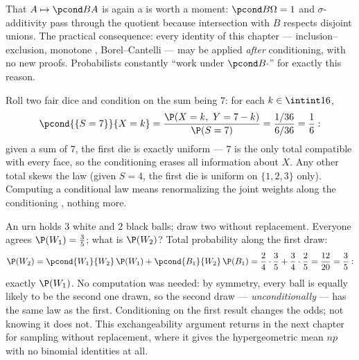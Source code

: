 \begin{remark}
That $A \mapsto \pcond BA$ is again a  is
worth a moment: $\pcond B\Omega = 1$ and $\sigma$-additivity
pass through the quotient because intersection with $B$
respects disjoint unions. The practical consequence: every
identity of this chapter --- inclusion--exclusion, monotone
, Borel--Cantelli --- may be applied \emph{after}
conditioning, with no new proofs. Probabilists constantly
``work under $\pcond B{\cdot}$'' for exactly this reason.
\end{remark}

\begin{example}\label{ex:b2:proba:sumseven}
Roll two fair dice and condition on the sum being $7$: for
each $k \in \intint16$,
\[
\pcond{\{S = 7\}}{X = k}
= \frac{\P(X = k,\ Y = 7 - k)}{\P(S = 7)}
= \frac{1/36}{6/36} = \frac16 :
\]
given a sum of $7$, the first die is exactly uniform ---
$7$ is the only total compatible with every face, so the
conditioning erases all information about $X$. Any other
total skews the law (given $S = 4$, the first die is uniform
on $\{1, 2, 3\}$ only). Computing a conditional law means
renormalizing the joint weights along the conditioning
, nothing more.
\end{example}

\begin{example}\label{ex:b2:proba:seconddraw}
An urn holds $3$ white and $2$ black balls; draw two without
replacement. Everyone agrees $\P(W_1) = \frac35$; what is
$\P(W_2)$? Total probability along the first draw:
\[
\P(W_2) = \pcond{W_1}{W_2}\,\P(W_1) +
\pcond{B_1}{W_2}\,\P(B_1)
= \frac24\cdot\frac35 + \frac34\cdot\frac25
= \frac{12}{20} = \frac35 :
\]
exactly $\P(W_1)$. No computation was needed: by symmetry,
every ball is equally likely to be the second one drawn, so
the second draw --- \emph{unconditionally} --- has the same
law as the first. Conditioning on the first result changes
the odds; not knowing it does not. This exchangeability
argument returns in the next chapter for sampling without
replacement, where it gives the hypergeometric mean $np$
with no binomial identities at all.
\end{example}

